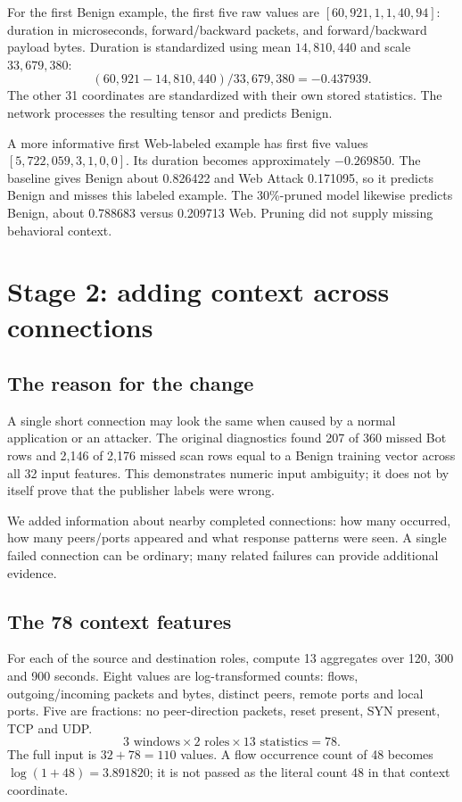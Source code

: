 \documentclass[11pt,a4paper,oneside]{report}
\begin{document}
For the first Benign example, the first five raw values are $[60{,}921,1,1,40,94]$: duration in microseconds, forward/backward packets, and forward/backward payload bytes. Duration is standardized using mean $14{,}810{,}440$ and scale $33{,}679{,}380$:
\[(60{,}921-14{,}810{,}440)/33{,}679{,}380=-0.437939.\]
The other 31 coordinates are standardized with their own stored statistics. The network processes the resulting tensor and predicts Benign.

A more informative first Web-labeled example has first five values $[5{,}722{,}059,3,1,0,0]$. Its duration becomes approximately $-0.269850$. The baseline gives Benign about 0.826422 and Web Attack 0.171095, so it predicts Benign and misses this labeled example. The 30\%-pruned model likewise predicts Benign, about 0.788683 versus 0.209713 Web. Pruning did not supply missing behavioral context.

\chapter{Stage 2: adding context across connections}
\section{The reason for the change}
A single short connection may look the same when caused by a normal application or an attacker. The original diagnostics found 207 of 360 missed Bot rows and 2,146 of 2,176 missed scan rows equal to a Benign training vector across all 32 input features. This demonstrates numeric input ambiguity; it does not by itself prove that the publisher labels were wrong.

We added information about nearby completed connections: how many occurred, how many peers/ports appeared and what response patterns were seen. A single failed connection can be ordinary; many related failures can provide additional evidence.

\section{The 78 context features}
For each of the source and destination roles, compute 13 aggregates over 120, 300 and 900 seconds. Eight values are log-transformed counts: flows, outgoing/incoming packets and bytes, distinct peers, remote ports and local ports. Five are fractions: no peer-direction packets, reset present, SYN present, TCP and UDP.
\[3\text{ windows}\times2\text{ roles}\times13\text{ statistics}=78.\]
The full input is $32+78=110$ values. A flow occurrence count of 48 becomes $\log(1+48)=3.891820$; it is not passed as the literal count 48 in that context coordinate.
\end{document}
